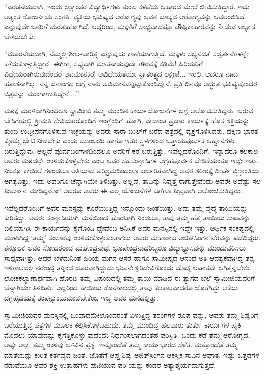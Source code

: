 “ಎರಡನೆಯದಾಗಿ, ಇಂದು ಲಕ್ಷಾಂತರ ವಿದ್ಯಾರ್ಥಿಗಳು ತುಂಬ ಕಳಪೆಯ ಆಹಾರದ ಮೇಲೆ ಜೀವಿಸುತ್ತಿದ್ದಾರೆ. ಇದು ಅತ್ಯಂತ ಶೋಚನೀಯ ಸಂಗತಿ. ವ್ಯಕ್ತಿಯ ಭವಿಷ್ಯದ ಆರೋಗ್ಯವು ಅವನ ಬಾಲ್ಯದ ಆರೋಗ್ಯವನ್ನು ಅವಲಂಬಿಸಿದೆ ಎನ್ನುವುದೇ ಜನರಿಗೆ ಮರೆತುಹೋಗಿದೆ. ಆದ್ದರಿಂದ, ಮಕ್ಕಳಿಗೆ ಸಾಧ್ಯವಾದಷ್ಟೂ ಪೌಷ್ಟಿಕಾಹಾರವನ್ನು ನೀಡುವ ಅಭ್ಯಾಸ ಬೆಳೆಯಬೇಕು.

“ಮೂರನೆಯದಾಗಿ, ನಮ್ಮಲ್ಲಿ ಶೀಲ-ಚಾರಿತ್ರ್ಯ ಎನ್ನುವುದು ಕಾಣೆಯಾಗುತ್ತಿದೆ. ಮಕ್ಕಳು ಸಭ್ಯನಡತೆ ಸದ್ವರ್ತನೆಗಳನ್ನೇ ಕಳೆದುಕೊಳ್ಳುತ್ತಿದ್ದಾರೆ. ಈಗೀಗ, ಸಭ್ಯವಾಗಿ ಮಾತನಾಡುವುದೇ ಗೌರವಕ್ಕೆ ಕಡಿಮೆ! ಹಿರಿಯರಿಗೆ ವಿಧೇಯರಾಗಿರುವುದೆಂದರೆ ಅವಮಾನಕರ! ಅವಿಧೇಯತೆಯೇ ಸ್ವಾತಂತ್ರ್ಯದ ಲಕ್ಷಣ!... ಇರಲಿ, ಆದರೂ ನಾನು ಹತಾಶನಾಗಿಲ್ಲ. ನನ್ನ ಜನಾಂಗದ ಬಗ್ಗೆ ನಾನು ಅಭಿಮಾನವನ್ನಿಟ್ಟುಕೊಂಡಿದ್ದೇನೆ. ಪ್ರತಿ ದಿನವೂ ಅದ್ಭುತ ಭವಿಷ್ಯವೊಂದರ ಚಿತ್ರವನ್ನು ಮುಂಗಾಣುತ್ತಿದ್ದೇನೆ....”

ಮಠಕ್ಕೆ ಮರಳಿದಾಗಿನಿಂದಲೂ ಸ್ವಾಮೀಜಿ ತಮ್ಮ ಮುಂದಿನ ಕಾರ್ಯಯೋಜನೆಗಳ ಬಗ್ಗೆ ಆಲೋಚಿಸುತ್ತಿದ್ದರು. ಬರುವ ಬೇಸಿಗೆಯಲ್ಲಿ ಶ್ರೀಮತಿ ಸೇವಿಯರರೊಂದಿಗೆ ಇಂಗ್ಲೆಂಡಿಗೆ ಹೋಗಿ, ವೇದಾಂತ ಪ್ರಚಾರ ಕಾರ್ಯಕ್ಕೆ ಹೊಸ ಶಕ್ತಿಯನ್ನು ತುಂಬಿ ಉದ್ದೀಪನಗೊಳಿಸುವ ಇಚ್ಛೆಯನ್ನು ಅವರು ಸಾರಾ ಬುಲ್​ಗೆ ಬರೆದ ಪತ್ರದಲ್ಲಿ ವ್ಯಕ್ತಗೊಳಿಸಿದರು. ದಕ್ಷಿಣ ಭಾರತ ಕ್ಕೊಮ್ಮೆ ಭೇಟಿ ನೀಡಬೇಕು ಎಂದು ಮುಂಬಯಿ ಹಾಗೂ ಇತರ ಸ್ಥಳಗಳಿಂದ ಒತ್ತಾಯಪೂರ್ವಕ ಆಹ್ವಾನಗಳು ಬರುತ್ತಿದ್ದುವು. ಅಲ್ಲದೆ ಪೂರ್ವಬಂಗಾಳದಿಂದಲೂ ಅವರಿಗೆ ಕರೆ ಬರುತ್ತಿತ್ತು. ಇವೆಲ್ಲದರೊಂದಿಗೆ, ಇನ್ನಾದರೂ ಕೆಲಕಾಲ ಅವರು ಮಠದಲ್ಲೇ ಉಳಿದುಕೊಳ್ಳಬೇಕು ಎಂಬ ಅವರ ಸಹಸಂನ್ಯಾಸಿಗಳ ಆಗ್ರಹಪೂರ್ವಕ ಬೇಡಿಕೆಯಂತೂ ಇದ್ದೇ ಇತ್ತು. ನಿಜಕ್ಕೂ ಕಾಯಿಲೆ ಗಳಿಂದಲೂ ಅತಿಯಾದ ಪರಿಶ್ರಮದಿಂದಲೂ ಜರ್ಜರಿತವಾಗಿದ್ದ ಅವರ ಶರೀರಕ್ಕೆ ದೀರ್ಘ ವಿಶ್ರಾಂತಿಯ ಅಗತ್ಯವಿತ್ತು. ಇದು ಅವರಿಗೂ ಚೆನ್ನಾಗಿಯೇ ತಿಳಿದಿತ್ತು. ಅಲ್ಲದೆ, ತಾವಿನ್ನು ನಿವೃತ್ತ ರಾಗುತ್ತೇವೆಂದು ಅವರೇ ಅದೆಷ್ಟು ಸಲ ತೀರ್ಮಾನ ಮಾಡಿದ್ದರೋ! ಆದರೂ ಅವರು ಈ ಎಲ್ಲ ಯೋಜನೆಗಳ ಬಗೆಗೂ ತೀವ್ರವಾಗಿ ಆಲೋಚಿಸುತ್ತಿದ್ದರು.

ಇವೆಲ್ಲದರೊಂದಿಗೆ ಅವರ ಮನಸ್ಸನ್ನು ಕೊರೆಯುತ್ತಿದ್ದ ಇನ್ನೊಂದು ಚಿಂತೆಯಿತ್ತು. ಅದು ತಮ್ಮ ವೃದ್ಧ ತಾಯಿಯನ್ನು ಕುರಿತದ್ದು. ಅವರು ಸಂನ್ಯಾಸಿಯಾಗಿ ಮನೆಯಿಂದ ಹೊರಟಾಗಿ ನಿಂದಲೂ, ತಾವು ತಮ್ಮ ಹೆತ್ತ ತಾಯಿಯ ಸುಖವನ್ನು ಬಲಿಯಾಗಿಸಿ ಈ ಕಾರ್ಯವನ್ನು ಕೈಗೊಂಡಿ ದ್ದೇವೆಂಬ ಅನಿಸಿಕೆ ಅವರ ಮನಸ್ಸಿನಲ್ಲಿ ಇದ್ದೇ ಇತ್ತು. ಆರ್ಥಿಕ ಸಂಕಷ್ಟದಲ್ಲಿ ಮುಳುಗಿದ್ದ ‘ತಮ್ಮ’ ಸಂಸಾರವು ಉಳಿದುಕೊಳ್ಳುವಂತಾಗಲು ಅವರು ಮಹಾರಾಜ ಅಜಿತ್​ಸಿಂಗನ ನೆರವನ್ನು ಪಡೆದಿದ್ದರು. ತನ್ಮೂಲಕ ಅವರ ಸೋದರರಾದ ಮಹೇಂದ್ರನಾಥ, ಭೂಪೇಂದ್ರನಾಥರಿಬ್ಬರೂ ವಿದ್ಯಾಭ್ಯಾಸವನ್ನು ಮುಂದುವರಿಸಲು ಸಾಧ್ಯವಾಗಿತ್ತು. ಆದರೆ ಬೆಳೆದುನಿಂತ ಹಿರಿಯ ಮಗನ ಆಸರೆ ಹಾಗೂ ಸಾಮೀಪ್ಯದ ಆನಂದ ಅತಿ ಆವಶ್ಯಕವಾಗಿದ್ದ ತನ್ನ ಇಳಿಗಾಲದಲ್ಲಿ ನರೇಂದ್ರ ತನ್ನಿಂದ ದೂರವಾಗಿದ್ದುದು ಭುವನೇಶ್ವರಿದೇವಿಗೊಂದು ದೊಡ್ಡ ಆಘಾತವೇ ಆಗಿತ್ತೆನ್ನಬೇಕು. ಲೋಕಕಲ್ಯಾಣಾರ್ಥವಾಗಿ ಹೊರಟ ತಮ್ಮ ವಿಷಯದಲ್ಲಿ ತಮ್ಮ ತಾಯಿ ಮಾಡಿದ ಈ ತ್ಯಾಗದ ಬೆಲೆ ಸ್ವಾಮೀಜಿಯವರಿಗೆ ಚೆನ್ನಾಗಿಯೇ ತಿಳಿದಿತ್ತು. ಆದ್ದರಿಂದ ತಾಯಿಯ ಕೊನೆಗಾಲದಲ್ಲಿ ತಾವು ಕೆಲಕಾಲವಾದರೂ ಜೊತೆಗಿದ್ದು ಆಕೆಯ ದಗ್ಧಹೃದಯಕ್ಕೆ ತಂಪನ್ನುಂಟುಮಾಡಬೇಕೆಂಬ ಇಚ್ಛೆ ಅವರ ಮನದಲ್ಲಿತ್ತು.

ಸ್ವಾಮೀಜಿಯವರ ಮನಸ್ಸಿನಲ್ಲಿ ಒಂದಾದಮೇಲೊಂದರಂತೆ ಏಳುತ್ತಿದ್ದ ತರಂಗಗಳ ರೂಪ ವನ್ನು, ಅವರು ತಮ್ಮ ಶಿಷ್ಯರಿಗೆ ಬರೆಯುತ್ತಿದ್ದ ಪತ್ರಗಳ ಮೂಲಕ ಕಲ್ಪಿಸಿಕೊಳ್ಳಬಹುದು. ತಮ್ಮ ಮುಂದಿದ್ದ ಹಲವಾರು ತುರ್ತು ಕಾರ್ಯಗಳ ಪೈಕಿ ಮೊದಲು ಯಾವುದನ್ನು ಕೈಗೆತ್ತಿಕೊಳ್ಳು ವುದೆಂದು ನಿರ್ಧರಿಸಲಾಗದಂತಹ ಪರಿಸ್ಥಿತಿ. ಒಂದು ಕಡೆ ತಮ್ಮ ಆರೋಗ್ಯದ, ಅಷ್ಟೇ ಅಲ್ಲ, ತಮ್ಮ ಉಳಿವು ಅಳಿವಿನ ಪ್ರಶ್ನೆ. ಇನ್ನೊಂದೆಡೆ ತಮ್ಮ ಕಾರ್ಯಭಾರದ ಸೆಳೆತ. ಮತ್ತೊಂದೆಡೆ ತಮ್ಮ ಮಾತೆಯನ್ನು ಕುರಿತ ಕರ್ತವ್ಯದ ಚಿಂತೆ. ಜೊತೆಗೆ ಆಪ್ತ ಶಿಷ್ಯ ಅಜಿತ್​ಸಿಂಗನ ಆಕಸ್ಮಿಕ ಸಾವಿನ ಆಘಾತ. ಇಷ್ಟು ಒತ್ತಡಗಳ ನಡುವೆಯೂ ಅವರ ಶಕ್ತಿ ಉತ್ಸಾಹಗಳು ಪುಟಿಯುವ ಪರಿ ಯನ್ನು ಕಂಡರೆ ಅತ್ಯಾಶ್ಚರ್ಯವಾಗುತ್ತದೆ.

